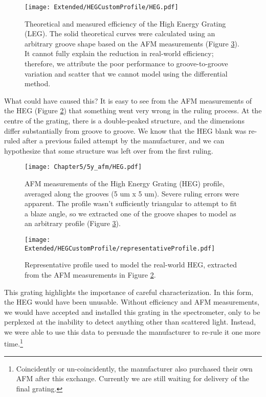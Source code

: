 \begin{figure}[htbp] %
   \centering
   \texttt{[image: Extended/HEGCustomProfile/HEG.pdf]} 
   \caption{Theoretical and measured efficiency of the High Energy Grating (LEG).  The solid theoretical curves were calculated using an arbitrary groove shape based on the AFM measurements (Figure \ref{hegRepresentativeGroove}).  It cannot fully explain the reduction in real-world efficiency; therefore, we attribute the poor performance to groove-to-groove variation and scatter that we cannot model using the differential method.}
   \label{5x-heg}
\end{figure}

What could have caused this? It is easy to see from the AFM measurements of the HEG (Figure \ref{5y-heg}) that something went very wrong in the ruling process.  At the centre of the grating, there is a double-peaked structure, and the dimensions differ substantially from groove to groove.  We know that the HEG blank was re-ruled after a previous failed attempt by the manufacturer, and we can hypothesize that some structure was left over from the first ruling.

\begin{figure}[htbp] %
   \centering
   \texttt{[image: Chapter5/5y\_afm/HEG.pdf]} 
   \caption{AFM measurements of the High Energy Grating (HEG) profile, averaged along the grooves (5 um x 5 um).  Severe ruling errors were apparent.  The profile wasn't sufficiently triangular to attempt to fit a blaze angle, so we extracted one of the groove shapes to model as an arbitrary profile (Figure \ref{hegRepresentativeGroove}).}
   \label{5y-heg}
\end{figure}

\begin{figure}[htbp] %
   \centering
   \texttt{[image: Extended/HEGCustomProfile/representativeProfile.pdf]} 
   \caption{Representative profile used to model the real-world HEG, extracted from the AFM measurements in Figure \ref{5y-heg}.}
   \label{hegRepresentativeGroove}
\end{figure}

This grating highlights the importance of careful characterization.  In this form, the HEG would have been unusable. Without efficiency and AFM measurements, we would have accepted and installed this grating in the spectrometer, only to be perplexed at the inability to detect anything other than scattered light.   Instead, we were able to use this data to persuade the manufacturer to re-rule it one more time.\footnote{Coincidently or un-coincidently, the manufacturer also purchased their own AFM after this exchange.  Currently we are still waiting for delivery of the final grating.}

